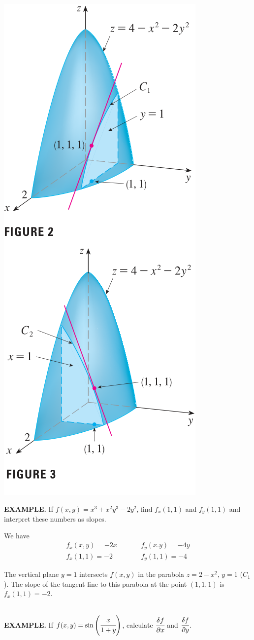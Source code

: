 \documentclass{article}
\begin{document}
\begin{minipage}[]{0.34\linewidth}
  \includegraphics[width = 4  cm]{./images/pareg2.png}
  
\end{minipage}
\begin{minipage}[b]{0.63\linewidth}

 {\selectfont \textbf{\textcolor{blue5}{{\small {}} EXAMPLE.}}} If $f(x,y) = x^3 + x^2 y^3 - 2 y^2 $, find $f_x (1,1)$ and $f_y (1,1)$ and interpret these numbers as slopes.

 We have 
 \begin{equation*}
   \begin{split}
      f_x (x,y) = -2x & \quad \text{ } \quad f_y (x.y) = -4y \\
      f_x(1,1) = -2 & \quad  \text{ } \quad f_y(1,1) = -4  
   \end{split}
 \end{equation*}
 
 The vertical plane $y = 1 $ intersects $f(x,y)$ in the parabola $z = 2 - x^2 $, $y = 1$ ($C_1$). The slope of the tangent line to this parabola at the point $(1,1,1)$ is $f_x (1,1) = -2 $.
\end{minipage}\\
{\selectfont \textbf{\textcolor{blue5}{{\small {}} EXAMPLE.}}} If $f(x,y) = \sin{\left(\cfrac{x }{1 + y }\right)}$, calculate $\cfrac{\delta f }{\partial x }$ and $\cfrac{\delta f}{\partial y}$.
\end{document}
